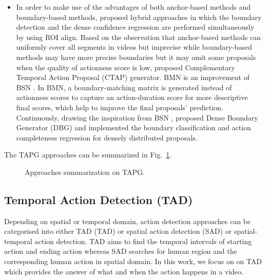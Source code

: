 \documentclass{ieeeaccess}
\begin{document}
\begin{itemize}
\item In order to make use of the advantages of both anchor-based methods and boundary-based methods, \cite{bmn, dbg} proposed hybrid approaches in which the boundary detection and the dense confidence regression are performed simultaneously by using ROI align. Based on the observation that anchor-based methods can uniformly cover all segments in videos but imprecise while boundary-based methods may have more precise boundaries but it may omit some proposals when the quality of actionness score is low, \cite{CTAP} proposed Complementary Temporal Action Proposal (CTAP) generator. BMN \cite{bmn} is an improvement of BSN \cite{lin2018bsn}. In BMN, a boundary-matching matrix is generated instead of actionness scores to capture an action-duration score for more descriptive final scores, which help to improve the final proposals' prediction. Continuously, drawing the inspiration from BSN \cite{lin2018bsn}, \cite{dbg} proposed Dense Boundary Generator (DBG) and implemented the boundary classification and action completeness regression for densely distributed proposals.
\end{itemize}

The TAPG approaches can be summarized in Fig.~\ref{fig:fig_summary}.


\begin{figure}[ht]
\small
{}



\caption{Approaches summarization on TAPG.}
\label{fig:fig_summary}
\end{figure}





\subsection{Temporal Action Detection (TAD)}
Depending on spatial or temporal domain, action detection approaches can be categorised into either TAD (TAD) or spatial action detection (SAD) or spatial-temporal action detection. TAD aims to find the temporal intervals of starting action and ending action whereas SAD searches for human region and the corresponding human action in spatial domain. In this work, we focus on on TAD which provides the answer of what and when the action happens in a video.
\end{document}
